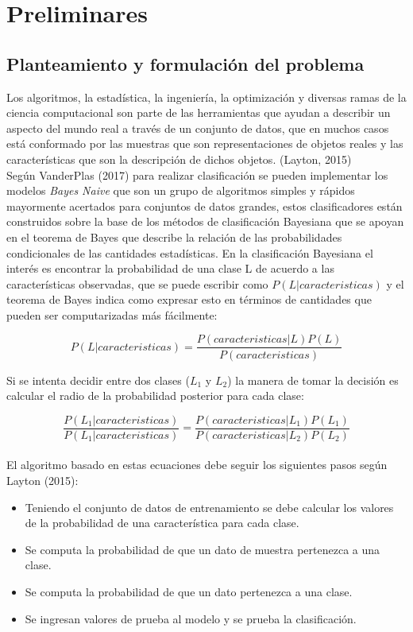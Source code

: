 \chapter{Preliminares}

\section{Planteamiento y formulaci\'on del problema}

Los algoritmos, la estadística, la ingeniería, la optimización y diversas ramas de la
ciencia computacional son parte de las herramientas que ayudan a describir un aspecto
del mundo real a través de un conjunto de datos,  que en muchos casos está conformado
por las muestras que son representaciones de objetos reales y las características que
son la descripción de dichos objetos. (Layton, 2015)\\

Según VanderPlas (2017) para realizar clasificación se pueden implementar los modelos
\textit{Bayes Naive} que son un grupo de algoritmos simples y rápidos mayormente
acertados para conjuntos de datos grandes, estos clasificadores están construidos sobre
la base de los métodos de clasificación Bayesiana que se apoyan en el teorema de Bayes
que describe la relación de las probabilidades condicionales de las cantidades estadísticas.
En la clasificación Bayesiana el interés es encontrar la probabilidad de una clase L de
acuerdo a las características observadas, que se puede escribir como
$P\left(L|caracteristicas\right)$ y el teorema de Bayes indica como expresar esto en
términos de cantidades que pueden ser computarizadas más fácilmente:

\[P\left(L|caracteristicas\right)=\frac{P\left(caracteristicas|L\right)P\left(L\right)}{P\left(caracteristicas\right)}\]

Si se intenta decidir entre dos clases ($L_{1}$ y $L_{2}$) la manera de tomar la decisión
es calcular el radio de la probabilidad posterior para cada clase:

\[\frac{P\left(L_{1}|caracteristicas\right)}{P\left(L_{1}|caracteristicas\right)}=\frac{P\left(caracteristicas|L_{1}\right)P\left(L_{1}\right)}{P\left(caracteristicas|L_{2}\right)P\left(L_{2}\right)}\]\\

El algoritmo basado en estas ecuaciones debe seguir los siguientes pasos según Layton
(2015):

\begin{itemize}
	\item Teniendo el conjunto de datos de entrenamiento se debe calcular los valores
	de la probabilidad de una característica para cada clase.
	\item Se computa la probabilidad de que un dato de muestra pertenezca a una clase.
	\item Se computa la probabilidad de que un dato pertenezca a una clase.
	\item Se ingresan valores de prueba al modelo y se prueba la clasificación.
\end{itemize}

